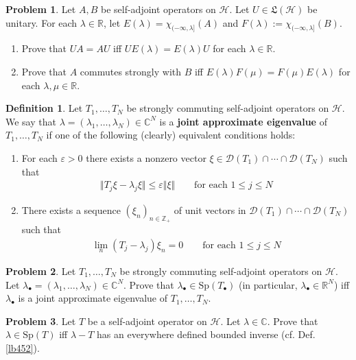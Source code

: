 \documentclass[12pt,b5paper,notitlepage]{article}
\theoremstyle{definition}
\newtheorem{df}{Definition}[subsection]
\newtheorem{prob}{\color{red}Problem}[section]
\theoremstyle{plain}
\newcommand{\fk}{\mathfrak}
\newcommand{\Dom}{\mathscr{D}}
\newcommand{\blt}{\bullet}
\newcommand{\Cbb}{\mathbb C}
\newcommand{\Zbb}{\mathbb Z}
\newcommand{\Rbb}{\mathbb R}
\newcommand{\Sp}{\mathrm{Sp}}
\newcommand{\eps}{\varepsilon}
\newcommand{\MH}{\mathcal H}
\numberwithin{equation}{section}
\begin{document}
\begin{prob}
Let $A,B$ be self-adjoint operators on $\MH$. Let $U\in\fk L(\MH)$ be unitary. For each $\lambda\in\Rbb$, let $E(\lambda)=\chi_{(-\infty,\lambda]}(A)$ and $F(\lambda):=\chi_{(-\infty,\lambda]}(B)$.
\begin{enumerate}
\item Prove that $UA=AU$ iff $UE(\lambda)=E(\lambda)U$ for each $\lambda\in\Rbb$.
\item Prove that $A$ commutes strongly with $B$ iff $E(\lambda)F(\mu)=F(\mu)E(\lambda)$ for each $\lambda,\mu\in\Rbb$.
\end{enumerate}
\end{prob}





\begin{df}
Let $T_1,\dots,T_N$ be strongly commuting self-adjoint operators on $\MH$. We say that $\lambda=(\lambda_1,\dots,\lambda_N)\in\Cbb^N$ is a \textbf{joint approximate eigenvalue}  of $T_1,\dots,T_N$ if one of the following (clearly) equivalent conditions holds:
\begin{enumerate}
\item[(1)] For each $\eps>0$ there exists a nonzero vector $\xi\in\Dom(T_1)\cap\cdots\cap\Dom(T_N)$ such that
\begin{align*}
\Vert T_j\xi-\lambda_j\xi\Vert\leq\eps\Vert\xi\Vert\qquad\text{for each $1\leq j\leq N$}
\end{align*}
\item[(2)] There exists a sequence $(\xi_n)_{n\in\Zbb_+}$ of unit vectors in $\Dom(T_1)\cap\cdots\cap\Dom(T_N)$ such that
\begin{align*}
\lim_n (T_j-\lambda_j)\xi_n=0\qquad\text{for each $1\leq j\leq N$}
\end{align*}
\end{enumerate}
\end{df}


\begin{prob}
Let $T_1,\dots,T_N$ be strongly commuting self-adjoint operators on $\MH$. Let $\lambda_\blt=(\lambda_1,\dots,\lambda_N)\in\Cbb^N$. Prove that $\lambda_\blt\in\Sp(T_\blt)$ (in particular, $\lambda_\blt\in\Rbb^N$) iff $\lambda_\blt$ is a joint approximate eigenvalue of $T_1,\dots,T_N$.
\end{prob}

\begin{prob}
Let $T$ be a self-adjoint operator on $\MH$. Let $\lambda\in\Cbb$. Prove that $\lambda\in\Sp(T)$ iff $\lambda-T$ has an everywhere defined bounded inverse (cf. Def. \ref{lb452}).
\end{prob}
\end{document}
